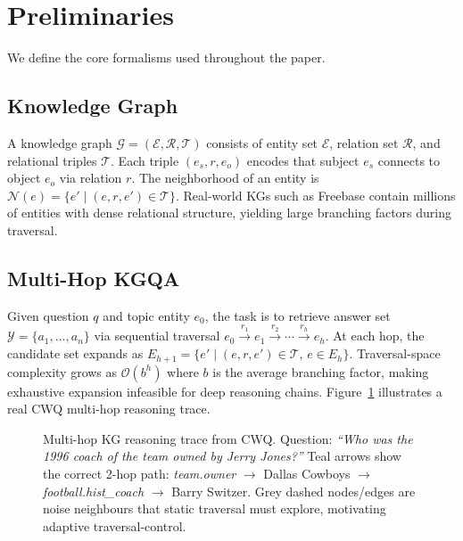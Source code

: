 \documentclass[10pt,conference]{IEEEtran}
\begin{document}

\section{Preliminaries}

We define the core formalisms used throughout the paper.

\subsection{Knowledge Graph}

A knowledge graph $\mathcal{G}=(\mathcal{E},\mathcal{R},\mathcal{T})$ consists of entity set $\mathcal{E}$, relation set $\mathcal{R}$, and relational triples $\mathcal{T}$. Each triple $(e_s,r,e_o)$ encodes that subject $e_s$ connects to object $e_o$ via relation $r$. The neighborhood of an entity is $\mathcal{N}(e) = \{ e' \mid (e,r,e') \in \mathcal{T} \}$. Real-world KGs such as Freebase contain millions of entities with dense relational structure, yielding large branching factors during traversal.

\subsection{Multi-Hop KGQA}

Given question $q$ and topic entity $e_0$, the task is to retrieve answer set $\mathcal{Y}=\{a_1,\dots,a_n\}$ via sequential traversal $e_0 \xrightarrow{r_1} e_1 \xrightarrow{r_2} \cdots \xrightarrow{r_h} e_h$. At each hop, the candidate set expands as $E_{h+1} = \{ e' \mid (e,r,e') \in \mathcal{T},\, e \in E_h \}$. Traversal-space complexity grows as $\mathcal{O}(b^h)$ where $b$ is the average branching factor, making exhaustive expansion infeasible for deep reasoning chains. Figure~\ref{fig:kg} illustrates a real CWQ multi-hop reasoning trace.

\begin{figure}[!ht]
\centering
\resizebox{\columnwidth}{!}{}
\caption{Multi-hop KG reasoning trace from CWQ. Question: \textit{``Who was the 1996 coach of the team owned by Jerry Jones?''} Teal arrows show the correct 2-hop path: \textit{team.owner} $\to$ Dallas Cowboys $\to$ \textit{football.hist\_coach} $\to$ Barry Switzer. Grey dashed nodes/edges are noise neighbours that static traversal must explore, motivating adaptive traversal-control.}
\label{fig:kg}
\end{figure}
\end{document}
